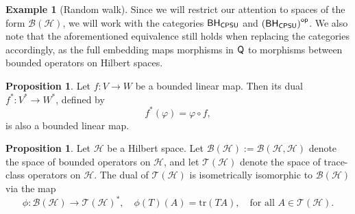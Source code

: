 \documentclass[10pt,a4paper]{amsart}
\theoremstyle{definition}
\theoremstyle{definition}
\newtheorem{example}[definition]{Example}
\theoremstyle{definition}
\theoremstyle{definition}
\newtheorem{proposition}[definition]{Proposition}
\theoremstyle{definition}
\theoremstyle{definition}
\begin{document}
\begin{example}[Random walk]
Since we will restrict our attention to spaces of the form $\mathcal{B}(\mathcal{H})$, we will work with the categories $\mathsf{BH_{CPSU}}$ and $\left(\mathsf{BH_{CPSU}}\right)^{\mathsf{op}}$. We also note that the aforementioned equivalence still holds when replacing the categories accordingly, as the full embedding maps morphisms in $\mathsf{Q}$ to morphisms between bounded operators on Hilbert spaces.







\begin{proposition} \cite[Proposition 2.3.10]{pedersenAnalysisNow1989}
Let \( f : V \to W \) be a bounded linear map. Then its dual \( f^* : V^* \to W^* \), defined by
\[
f^*(\varphi) = \varphi \circ f,
\]
is also a bounded linear map.
\end{proposition}

\begin{proposition} \cite[Theorem 19.2]{conwayCourseOperatorTheory2000}
  Let \(\mathcal{H}\) be a Hilbert space. Let \(\mathcal{B}(\mathcal{H}) := \mathcal{B}(\mathcal{H}, \mathcal{H})\) denote the space of bounded operators on \(\mathcal{H}\), and let \(\mathcal{T}(\mathcal{H})\) denote the space of trace-class operators on \(\mathcal{H}\).
    The dual of \(\mathcal{T}(\mathcal{H})\) is isometrically isomorphic to \(\mathcal{B}(\mathcal{H})\) via the map
    \[
    \phi : \mathcal{B}(\mathcal{H}) \to \mathcal{T}(\mathcal{H})^*, \quad \phi(T)(A) = \mathrm{tr}(TA), \quad \text{for all } A \in \mathcal{T}(\mathcal{H}).
    \]
\end{proposition}




\end{example}
\end{document}
